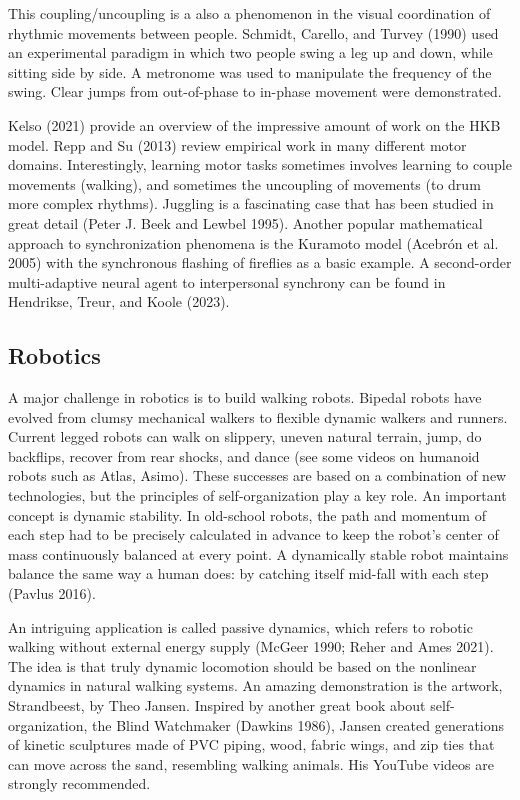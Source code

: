 \documentclass[
  a4paper,
  DIV=11,
  numbers=noendperiod]{scrreprt}
\begin{document}
This coupling/uncoupling is a also a phenomenon in the visual
coordination of rhythmic movements between people. Schmidt, Carello, and
Turvey (1990) used an experimental paradigm in which two people swing a
leg up and down, while sitting side by side. A metronome was used to
manipulate the frequency of the swing. Clear jumps from out-of-phase to
in-phase movement were demonstrated.

Kelso (2021) provide an overview of the impressive amount of work on the
HKB model. Repp and Su (2013) review empirical work in many different
motor domains. Interestingly, learning motor tasks sometimes involves
learning to couple movements (walking), and sometimes the uncoupling of
movements (to drum more complex rhythms). Juggling is a fascinating case
that has been studied in great detail (Peter J. Beek and Lewbel 1995).
Another popular mathematical approach to synchronization phenomena is
the Kuramoto model (Acebrón et al. 2005) with the synchronous flashing
of fireflies as a basic example. A second-order multi-adaptive neural
agent to interpersonal synchrony can be found in Hendrikse, Treur, and
Koole (2023).

\hypertarget{sec-Robotics}{%
\subsection{Robotics}\label{sec-Robotics}}

A major challenge in robotics is to build walking robots. Bipedal robots
have evolved from clumsy mechanical walkers to flexible dynamic walkers
and runners. Current legged robots can walk on slippery, uneven natural
terrain, jump, do backflips, recover from rear shocks, and dance (see
some videos on humanoid robots such as Atlas, Asimo). These successes
are based on a combination of new technologies, but the principles of
self-organization play a key role. An important concept is dynamic
stability. In old-school robots, the path and momentum of each step had
to be precisely calculated in advance to keep the robot's center of mass
continuously balanced at every point. A dynamically stable robot
maintains balance the same way a human does: by catching itself mid-fall
with each step (Pavlus 2016).

An intriguing application is called passive dynamics, which refers to
robotic walking without external energy supply (McGeer 1990; Reher and
Ames 2021). The idea is that truly dynamic locomotion should be based on
the nonlinear dynamics in natural walking systems. An amazing
demonstration is the artwork, Strandbeest, by Theo Jansen. Inspired by
another great book about self-organization, the Blind Watchmaker
(Dawkins 1986), Jansen created generations of kinetic sculptures made of
PVC piping, wood, fabric wings, and zip ties that can move across the
sand, resembling walking animals. His YouTube videos are strongly
recommended.
\end{document}
